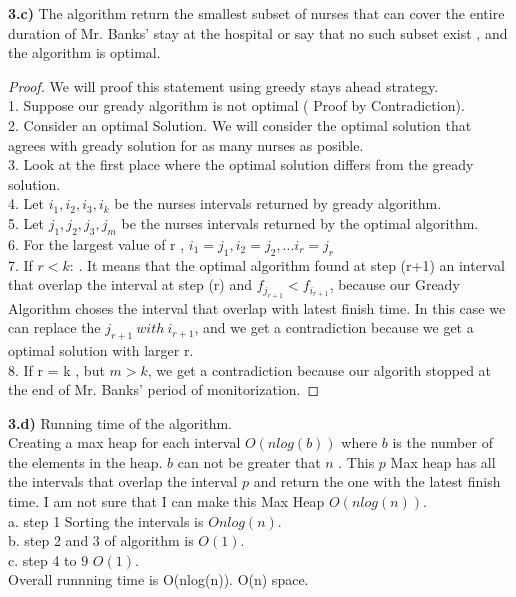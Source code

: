 \documentclass[11 pt]{article}
\begin{document}
\textbf{3.c)}
The  algorithm return the  smallest subset of nurses that can cover the entire duration of Mr. Banks’ stay at the hospital or say that no such subset exist , and the algorithm is optimal.
\begin {proof}
We will proof this statement using greedy stays ahead strategy.\\
1. Suppose our gready algorithm is not optimal ( Proof by Contradiction).\\
2. Consider an optimal Solution. We will consider the optimal solution that agrees with gready solution for as many nurses as posible.\\
3.  Look at the first place where the optimal solution differs from the gready solution.\\
4. Let $ i_1, i_2, i_3 , i_k $ be the nurses intervals returned by  gready algorithm.\\
5. Let $ j_1, j_2, j_3,  j_ m $ be the nurses intervals returned by the  optimal algorithm.\\
6. For the largest value of r ,  $i_1 = j_1, i_2 = j_2,  ... i_r = j_r$ \\
7. If $r <  k$: .  It means that the optimal algorithm found at step (r+1) an interval that overlap the interval at step (r) and $f_{j_{r+1}} < f_{i_{r+1}}$, because our Gready Algorithm choses the interval that overlap with latest finish time.  In this case we can replace the $j_{r+1} \ with \  i_{r+1}$, and we get a contradiction because we get a optimal solution with larger r.\\
8. If r = k , but $m > k$, we get a contradiction because our algorith stopped at the end of Mr. Banks’ period of monitorization.  

\end {proof} 


\textbf{3.d)} Running time of the algorithm.\\
 Creating a max heap for each interval  $O (n log(b))$  where $b$  is the number of the elements in the heap. $b$  can not be greater that $n$  . This  $p$  Max heap has all the intervals that overlap the interval $p$  and return the one with the latest finish time.  I am not sure that I  can make this Max Heap  $O(nlog(n))$. \\
 a. step 1 Sorting the intervals  is $O nlog(n)$.\\
 b. step 2 and 3  of algorithm is $O (1).$\\
 c. step 4 to 9 $O (1).$\\
 Overall runnning time is O(nlog(n)).  O(n) space.
\end{document}
